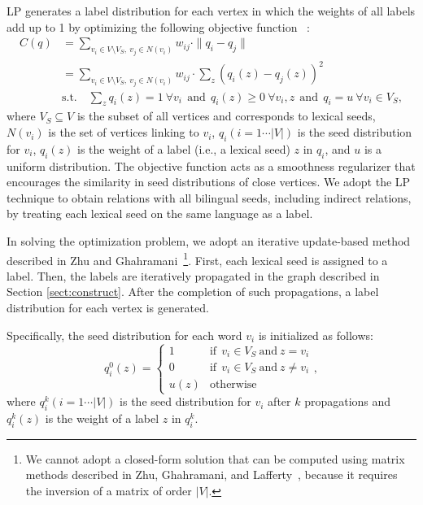 \documentclass[english]{jnlp_1.4}
\begin{document}
LP generates a label distribution for each vertex in which the weights of all labels add up to 1 by optimizing the following objective function ~\cite{zhu02}: 
\begin{equation}
\begin{split}
 C(q) & =  \sum_{v_{i} \in V \setminus V_{S},~v_{j} \in N(v_{i})} w_{ij} \cdot \parallel q_{i} - q_{j} \parallel \\
  & = \sum_{v_{i} \in V \setminus V_{S},~v_{j} \in N(v_{i})} w_{ij} \cdot \sum_{z}(q_{i}(z)-q_{j}(z))^{2} \\
  & \text{s.t.}\quad \sum_{z} q_{i}(z)=1~\forall v_{i}~~\text{and}~~q_{i}(z) \geq 0~\forall v_{i},z~~\text{and}~~q_{i}=u~\forall v_{i} \in V_{S}, 
\end{split}
\end{equation}
where $V_{S} \subseteq V$ is the subset of all vertices and corresponds to lexical seeds, $N(v_{i})$ is the set of vertices linking to $v_{i}$, $q_{i}(i=1 \cdots |V|)$ is the seed distribution for $v_{i}$, $q_{i}(z)$ is the weight of a label (i.e., a lexical seed) $z$ in $q_{i}$, and $u$ is a uniform distribution. 
The objective function acts as a smoothness regularizer that encourages the similarity in seed distributions of close vertices. 
We adopt the LP technique to obtain relations with all bilingual seeds, including indirect relations, by treating each lexical seed on the same language as a label. 

In solving the optimization problem, we adopt an iterative update-based method described in Zhu and Ghahramani~\citeyear{zhu02}\footnote{We cannot adopt a closed-form solution that can be computed using matrix methods described in Zhu, Ghahramani, and Lafferty~\citeyear{zhu03}, because it requires the inversion of a matrix of order $|V|$. }. 
First, each lexical seed is assigned to a label. Then, the labels are iteratively propagated in the graph described in Section \ref{sect:construct}. 
After the completion of such propagations, a label distribution for each vertex is generated. 

Specifically, the seed distribution for each word $v_i$ is initialized as follows: 
\begin{equation}
q_{i}^{0}(z)= \left \{
\begin{array}{ll}
1 & \text{if}~~v_{i} \in V_{S}~ \text{and}~ z = v_{i} \\
0 & \text{if}~~v_{i} \in V_{S}~ \text{and}~ z \neq v_{i}    \\
u(z) & \text{otherwise}
\end{array}
\right., 
\end{equation}
where $q_{i}^{k}(i=1 \cdots |V|)$ is the seed distribution for $v_{i}$ after $k$ propagations and $q_{i}^{k}(z)$ is the weight of a label $z$ in $q_{i}^{k}$. 
\end{document}
